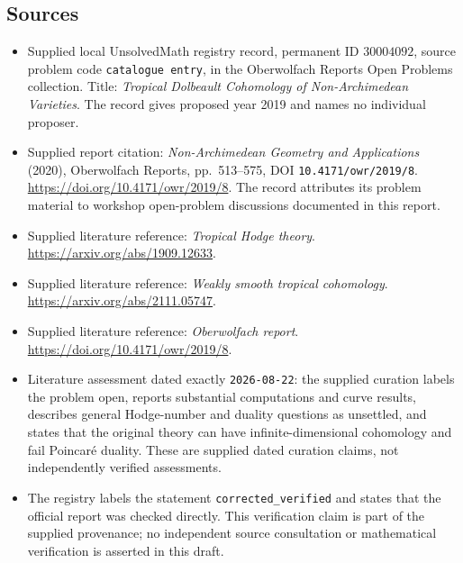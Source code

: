 \documentclass[11pt]{article}
\begin{document}
\subsection{Sources}
\begin{itemize}
\item Supplied local UnsolvedMath registry record, permanent ID \(30004092\), source problem code \texttt{catalogue entry}, in the Oberwolfach Reports Open Problems collection. Title: \emph{Tropical Dolbeault Cohomology of Non-Archimedean Varieties}. The record gives proposed year 2019 and names no individual proposer.
\item Supplied report citation: \emph{Non-Archimedean Geometry and Applications} (2020), Oberwolfach Reports, pp.~513--575, DOI \texttt{10.4171/owr/2019/8}. \url{https://doi.org/10.4171/owr/2019/8}. The record attributes its problem material to workshop open-problem discussions documented in this report.
\item Supplied literature reference: \emph{Tropical Hodge theory}. \url{https://arxiv.org/abs/1909.12633}.
\item Supplied literature reference: \emph{Weakly smooth tropical cohomology}. \url{https://arxiv.org/abs/2111.05747}.
\item Supplied literature reference: \emph{Oberwolfach report}. \url{https://doi.org/10.4171/owr/2019/8}.
\item Literature assessment dated exactly \texttt{2026-08-22}: the supplied curation labels the problem open, reports substantial computations and curve results, describes general Hodge-number and duality questions as unsettled, and states that the original theory can have infinite-dimensional cohomology and fail Poincar\'e duality. These are supplied dated curation claims, not independently verified assessments.
\item The registry labels the statement \texttt{corrected\_verified} and states that the official report was checked directly. This verification claim is part of the supplied provenance; no independent source consultation or mathematical verification is asserted in this draft.
\end{itemize}
\end{document}
